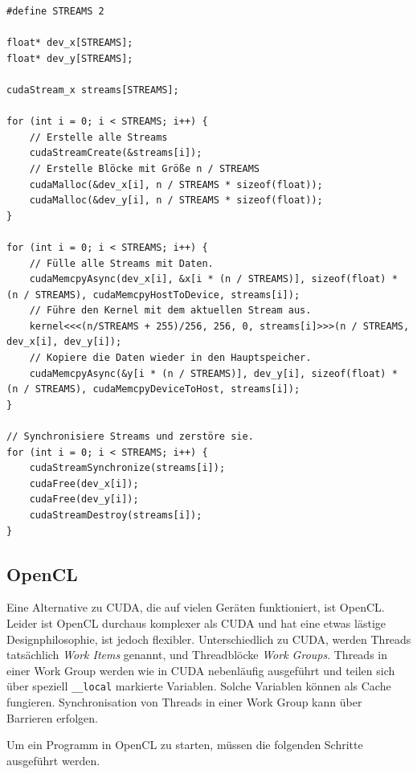 \begin{lstlisting}[label={lst:10}, caption={Ausführen eines Kernels mit 2 Streams.}]
#define STREAMS 2

float* dev_x[STREAMS];
float* dev_y[STREAMS];

cudaStream_x streams[STREAMS];

for (int i = 0; i < STREAMS; i++) {
    // Erstelle alle Streams
    cudaStreamCreate(&streams[i]);
    // Erstelle Blöcke mit Größe n / STREAMS
    cudaMalloc(&dev_x[i], n / STREAMS * sizeof(float));
    cudaMalloc(&dev_y[i], n / STREAMS * sizeof(float));
}

for (int i = 0; i < STREAMS; i++) {
    // Fülle alle Streams mit Daten.
    cudaMemcpyAsync(dev_x[i], &x[i * (n / STREAMS)], sizeof(float) * (n / STREAMS), cudaMemcpyHostToDevice, streams[i]);
    // Führe den Kernel mit dem aktuellen Stream aus.
    kernel<<<(n/STREAMS + 255)/256, 256, 0, streams[i]>>>(n / STREAMS, dev_x[i], dev_y[i]);
    // Kopiere die Daten wieder in den Hauptspeicher.
    cudaMemcpyAsync(&y[i * (n / STREAMS)], dev_y[i], sizeof(float) * (n / STREAMS), cudaMemcpyDeviceToHost, streams[i]);
}

// Synchronisiere Streams und zerstöre sie.
for (int i = 0; i < STREAMS; i++) {
    cudaStreamSynchronize(streams[i]);
    cudaFree(dev_x[i]);
    cudaFree(dev_y[i]);
    cudaStreamDestroy(streams[i]);
}
\end{lstlisting}

\subsection{OpenCL}
Eine Alternative zu CUDA, die auf vielen Geräten funktioniert, ist OpenCL.
Leider ist OpenCL durchaus komplexer als CUDA und hat eine etwas lästige Designphilosophie, ist jedoch flexibler.
Unterschiedlich zu CUDA, werden Threads tatsächlich \emph{Work Items} genannt, und Threadblöcke \emph{Work Groups}.
Threads in einer Work Group werden wie in CUDA nebenläufig ausgeführt und teilen sich über speziell \lstinline|__local| markierte Variablen.
Solche Variablen können als Cache fungieren.
Synchronisation von Threads in einer Work Group kann über Barrieren erfolgen.

Um ein Programm in OpenCL zu starten, müssen die folgenden Schritte ausgeführt werden.

